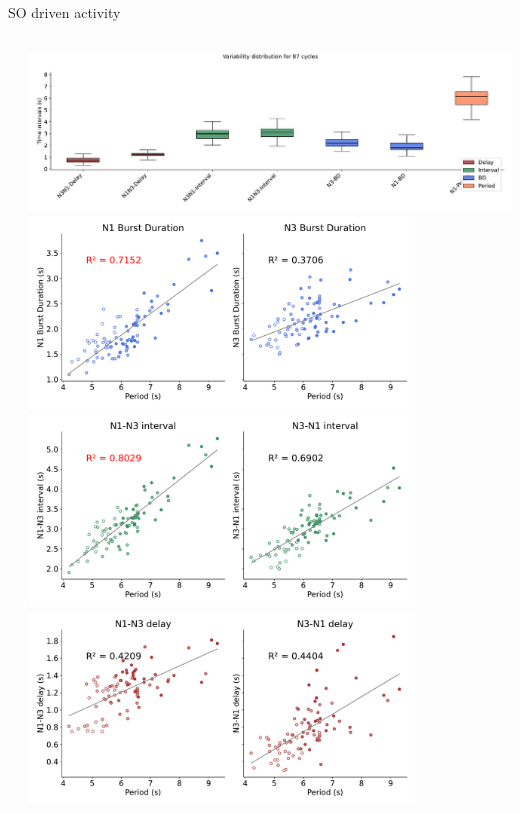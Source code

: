 \documentclass[aspectratio=43]{beamer}
\begin{document}
\begin{frame}{SO driven activity}
{\begin{columns}
\begin{column}{0.5\textwidth}
		\end{column}
		\begin{column}{0.5\textwidth}
			\includegraphics[width=\textwidth]{invariants/data/SUSSEX/prep4_so_driven_2/images/_boxplot_h.pdf}
			\centering
				\includegraphics[width=0.8\textwidth]{invariants/data/SUSSEX/prep4_so_driven_2/images/_durations.pdf}	\includegraphics[width=0.8\textwidth]{invariants/data/SUSSEX/prep4_so_driven_2/images/_intervals.pdf}	\includegraphics[width=0.8\textwidth]{invariants/data/SUSSEX/prep4_so_driven_2/images/_delays.pdf}	
			

\end{column}
\end{columns}}
\end{frame}
\end{document}
